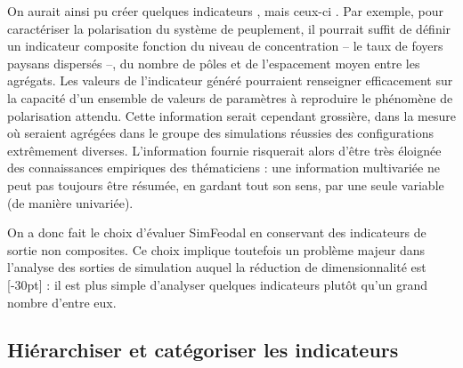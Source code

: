 On aurait ainsi pu créer quelques indicateurs , mais ceux-ci .
Par exemple, pour caractériser la polarisation du système de peuplement, il pourrait suffit de définir un indicateur composite fonction du niveau de concentration -- le taux de foyers paysans dispersés --, du nombre de pôles et de l'espacement moyen entre les agrégats.
Les valeurs de l'indicateur généré pourraient renseigner efficacement sur la capacité d'un ensemble de valeurs de paramètres à reproduire le phénomène de polarisation attendu.
Cette information serait cependant grossière, dans la mesure où seraient agrégées dans le groupe des \og simulations réussies\fg{} des configurations extrêmement diverses.
L'information fournie risquerait alors d'être très éloignée des connaissances empiriques des thématiciens :
une information multivariée ne peut pas toujours être résumée, en gardant tout son sens, par une seule variable (de manière univariée).

On a donc fait le choix d'évaluer SimFeodal en conservant des indicateurs de sortie non composites.
Ce choix implique toutefois un problème majeur dans l'analyse des sorties de simulation auquel la réduction de dimensionnalité est [-30pt] :
il est plus simple d'analyser quelques indicateurs plutôt qu'un grand nombre d'entre eux.

\clearpage

\subsection{Hiérarchiser et catégoriser les indicateurs}

